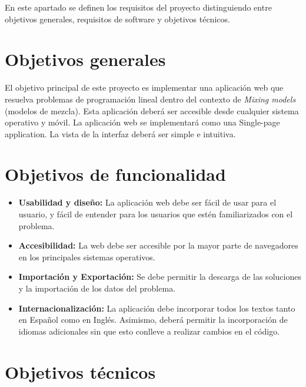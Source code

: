 
En este apartado se definen los requisitos del proyecto distinguiendo entre objetivos generales, requisitos de software y objetivos técnicos.

\section{Objetivos generales}

El objetivo principal de este proyecto es implementar una aplicación web que resuelva problemas de programación lineal dentro del contexto de \emph{Mixing models} (modelos de mezcla). Esta aplicación deberá ser accesible desde cualquier sistema operativo y móvil. La aplicación web se  implementará como una Single-page application. La vista de la interfaz deberá ser simple e intuitiva.

\section{Objetivos de funcionalidad}

\begin{itemize}
    \item \textbf{Usabilidad y diseño:} La aplicación web debe ser fácil de usar para el usuario, y fácil de entender para los usuarios que estén familiarizados con el problema.
    \item \textbf{Accesibilidad:} La web debe ser accesible por la mayor parte de navegadores en los principales sistemas operativos.
    \item \textbf{Importación y Exportación:} Se debe permitir la descarga de las soluciones y la importación de los datos del problema. %
    \item \textbf{Internacionalización:} La aplicación debe incorporar todos los textos tanto en Español como en Inglés. Asimismo, deberá permitir la incorporación de idiomas adicionales sin que esto conlleve a realizar cambios en el código.
\end{itemize}

\section{Objetivos técnicos}

